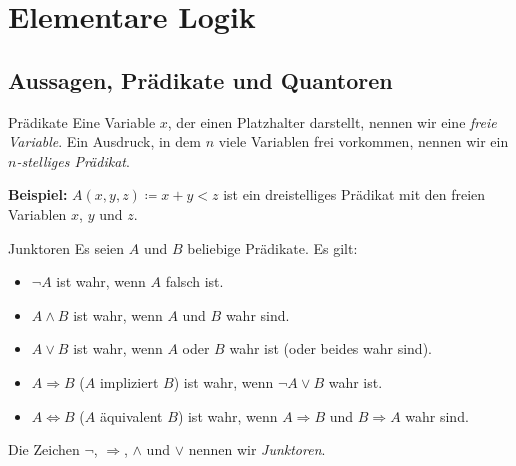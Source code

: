 \section{Elementare Logik}\label{sec:elementare-logik}

\subsection{Aussagen, Prädikate und Quantoren}\label{subsec:aussagen-pradikate-und-quantoren}

\begin{definition}{Prädikate}
    Eine Variable $x$, der einen Platzhalter darstellt, nennen wir eine \emph{freie Variable}.
    Ein Ausdruck, in dem $n$ viele Variablen frei vorkommen, nennen wir ein \emph{$n$-stelliges Prädikat}.
\end{definition}

\textbf{Beispiel:} $A(x,y,z) \coloneqq x + y < z$ ist ein dreistelliges Prädikat mit den freien Variablen $x$, $y$ und $z$.

\begin{definition}{Junktoren}
    Es seien $A$ und $B$ beliebige Prädikate.
    Es gilt:
    \begin{itemize}
        \item $\neg A$ ist wahr, wenn $A$ falsch ist.
        \item $A \land B$ ist wahr, wenn $A$ und $B$ wahr sind.
        \item $A \lor B$ ist wahr, wenn $A$ oder $B$ wahr ist (oder beides wahr sind).
        \item $A \Rightarrow B$ ($A$ impliziert $B$) ist wahr, wenn $\neg A \lor B$ wahr ist.
        \item $A \Leftrightarrow B$ ($A$ äquivalent $B$) ist wahr, wenn $A \Rightarrow B$ und $B \Rightarrow A$ wahr sind.
    \end{itemize}
    Die Zeichen $\neg$, $\Rightarrow$, $\land$ und $\lor$ nennen wir \emph{Junktoren}.
\end{definition}


